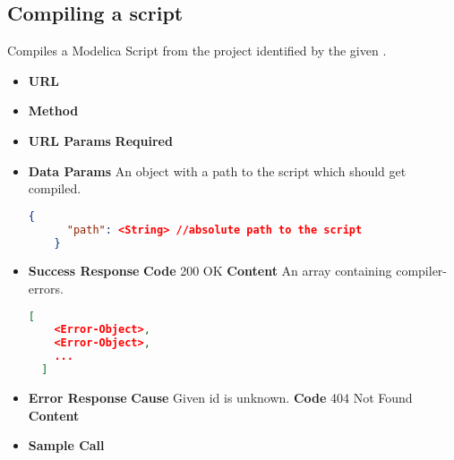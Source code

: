 \subsection{Compiling a script}
Compiles a Modelica Script from the project identified by the given .

\begin{itemize}
\item \textbf{URL} 
\item \textbf{Method} 

\item \textbf{URL Params}
  \newline\textbf{Required} 

\item \textbf{Data Params} An object with a path to the script which should get compiled.
  \begin{lstlisting}[basicstyle=\small,language=json]
    {
      "path": <String> //absolute path to the script
    }
  \end{lstlisting}

\item \textbf{Success Response}
  \newline\textbf{Code} 200 OK
  \newline\textbf{Content} An array containing compiler-errors.
  \begin{lstlisting}[basicstyle=\small,language=json]
  [
    <Error-Object>,
    <Error-Object>,
    ...
  ]
  \end{lstlisting}
  
\item \textbf{Error Response}
  \newline\textbf{Cause} Given id is unknown.
  \newline\textbf{Code} 404 Not Found
  \newline\textbf{Content} 

\item \textbf{Sample Call}
\end{itemize}
